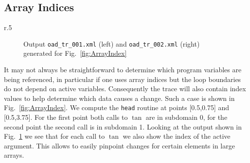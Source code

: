 \documentclass{article}
\newcommand{\reffig}[1]{{Fig.~\ref{#1}}}
\begin{document}
\subsection{Array Indices}\label{sec:ArrayIndex}
\begin{wrapfigure}[10]{r}{.5\textwidth}
\vspace*{-1cm}
\begin{minipage}{.96\linewidth}

\end{minipage}
\caption{An example for tracing array indices in select intrinsics}\label{fig:ArrayIndex} 
\end{wrapfigure} 
\begin{figure}
\begin{minipage}{.5\textwidth}

\end{minipage}
\begin{minipage}{.46\textwidth}

\end{minipage}
\caption{Output \lstinline{oad_tr_001.xml} (left) 
and \lstinline{oad_tr_002.xml} (right) 
generated for \reffig{fig:ArrayIndex}}\label{fig:ArrayIndexOutput}
\end{figure}
It may not always be straightforward to determine which program variables 
are being referenced, in particular if one uses array indices but the loop 
boundaries do not depend on active variables. Consequently the trace will 
also contain index values to help determine which data causes a change. 
Such a case is shown in \reffig{fig:ArrayIndex}.
We compute the \lstinline{head} routine at points [0.5,0.75] and [0.5,3.75].
For the first point both calls to $\tan$ are in subdomain 0, for the second 
point the second call is in subdomain 1. Looking at the output shown in \reffig{fig:ArrayIndexOutput}
we see that for each call to $\tan$ we also show the index of the active argument. 
This allows to easily pinpoint changes for certain elements in large arrays.    
\end{document}
